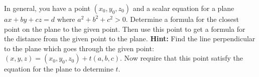 \begin{ex} In general, you have a point $(x_{0},y_{0},z_{0}) $ and a
scalar equation for a plane $ax+by+cz=d$ where $a^{2}+b^{2}+c^{2}>0$.
Determine a formula for the closest point on the plane to the given point.
Then use this point to get a formula for the distance from the given point
to the plane. \textbf{Hint: }Find the line perpendicular to the plane which
goes through the given point: $(x,y,z) =(
x_{0},y_{0},z_{0}) +t(a,b,c)$. Now require that this
point satisfy the equation for the plane to determine $t$.
\end{ex}

